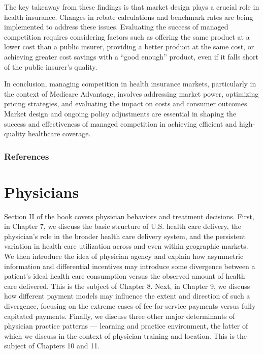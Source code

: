 \documentclass[
  letterpaper,
  DIV=11,
  numbers=noendperiod]{scrreport}
\theoremstyle{definition}
\theoremstyle{remark}
\begin{document}
The key takeaway from these findings is that market design plays a
crucial role in health insurance. Changes in rebate calculations and
benchmark rates are being implemented to address these issues.
Evaluating the success of managed competition requires considering
factors such as offering the same product at a lower cost than a public
insurer, providing a better product at the same cost, or achieving
greater cost savings with a ``good enough'' product, even if it falls
short of the public insurer's quality.

In conclusion, managing competition in health insurance markets,
particularly in the context of Medicare Advantage, involves addressing
market power, optimizing pricing strategies, and evaluating the impact
on costs and consumer outcomes. Market design and ongoing policy
adjustments are essential in shaping the success and effectiveness of
managed competition in achieving efficient and high-quality healthcare
coverage.

\hypertarget{references}{%
\section*{References}\label{references}}


\part{Physicians}

Section II of the book covers physician behaviors and treatment
decisions. First, in Chapter 7, we discuss the basic structure of U.S.
health care delivery, the physician's role in the broader health care
delivery system, and the persistent variation in health care utilization
across and even within geographic markets. We then introduce the idea of
physician agency and explain how asymmetric information and differential
incentives may introduce some divergence between a patient's ideal
health care consumption versus the observed amount of health care
delivered. This is the subject of Chapter 8. Next, in Chapter 9, we
discuss how different payment models may influence the extent and
direction of such a divergence, focusing on the extreme cases of
fee-for-service payments versus fully capitated payments. Finally, we
discuss three other major determinants of physician practice patterns
--- learning and practice environment, the latter of which we discuss in
the context of physician training and location. This is the subject of
Chapters 10 and 11.
\end{document}
